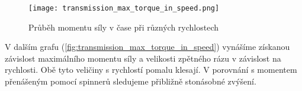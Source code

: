 \begin{wrapfigure}{r}{0.6\textwidth}
    \texttt{[image: transmission\_max\_torque\_in\_speed.png]}
    \caption{Průběh momentu síly v čase při různých rychlostech}
    \label{fig:transmission_max_torque_in_speed}
\end{wrapfigure}

V dalším grafu (\autoref{fig:transmission_max_torque_in_speed}) vynášíme získanou závislost maximálního momentu síly a velikosti zpětného rázu v závislost na rychlosti. Obě tyto veličiny s rychlostí pomalu klesají. V porovnání s momentem přenášeným pomocí spinnerů sledujeme přibližně stonásobné zvýšení.


